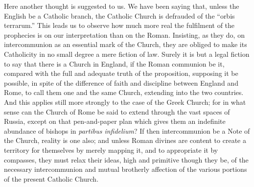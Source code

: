 Here another thought is suggested to us. We have
been saying that, unless the English be a Catholic branch, the
Catholic Church is defrauded of the ``orbis terrarum.'' This leads
us to observe how much more real the fulfilment of the prophecies is
on our interpretation than on the Roman. Insisting, as they do, on
intercommunion as an essential mark of the Church, they are obliged to
make its Catholicity in no small degree a mere fiction of law. Surely
it is but a legal fiction to say that there is a Church in England, if
the Roman communion be it, compared with the full and adequate truth
of the proposition, supposing it be possible, in spite of the
difference of faith and discipline between England and Rome, to call
them one and the same Church, extending into the two countries. And
this applies still more strongly to the case of the Greek Church; for
in what sense can the Church of Rome be said to extend through the
vast spaces of Russia, except on that pen-and-paper plan which gives
them an indefinite abundance of bishops in \emph{partibus infidelium}?
If then intercommunion be a Note of the Church, reality is one also;
and unless Roman divines are content to create a territory for
themselves by merely mapping it, and to appropriate it by compasses,
they must relax their ideas, high and primitive though they be, of the
necessary intercommunion and mutual brotherly affection of the various
portions of the present Catholic Church.

